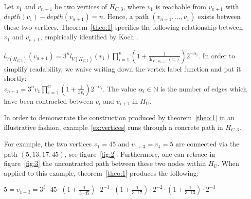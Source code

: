 Let $v_1$ and $v_{n+1}$ be two vertices of $H_{C,3}$, where $v_1$ is reachable from $v_{n+1}$ with $depth(v_1)-depth(v_{n+1})=n$. Hence, a path $(v_{n+1},\ldots,v_1)$ exists between these two vertices. Theorem~\ref{theo:1} specifies the following relationship between $v_1$ and $v_{n+1}$, empirically identified by Koch \cite{Ref_Koch_Github}.

\begin{theorem}
	\label{theo:1}
	$l_{V(H_{C,3})}(v_{n+1})=3^nl_{V(H_{C,3})}(v_1)\prod_{i=1}^{n}\left(1+\frac{1}{3l_{V(H_{C,3})}(v_{i})}\right)2^{-\alpha_i}$.
	In order to simplify readability, we waive writing down the vertex label function and put it shortly:\\
	$v_{n+1}=3^nv_1\prod_{i=1}^{n}\left(1+\frac{1}{3v_{i}}\right)2^{-\alpha_i}$.
	The value $\alpha_i\in\mathbb{N}$ is the number of edges which have been contracted between $v_i$ and $v_{i+1}$ in $H_U$.
\end{theorem}

In order to demonstrate the construction produced by theorem~\ref{theo:1} in an illustrative fashion, example~\ref{ex:vertices} runs through a concrete path in $H_{C,3}$.

\begin{example}
	\label{ex:vertices}
	For example, the two vertices $v_1=45$ and $v_{1+3}=v_4=5$ are 
	connected
	via the path $(5,13,17,45)$, see figure~\ref{fig:2}. Furthermore, one
	can retrace in figure~\ref{fig:3} the uncontracted path between these
	two nodes within $H_U$. When applied to this example,
	theorem~\ref{theo:1} produces the following:	
	\begin{center}
		$5=v_{1+3}=3^3\cdot45\cdot\left(1+\frac{1}{3\cdot45}\right)\cdot2^{-3}
		\cdot\left(1+\frac{1}{3\cdot17}\right)\cdot2^{-2}
		\cdot\left(1+\frac{1}{3\cdot13}\right)\cdot2^{-3}$
	\end{center} 
\end{example}

